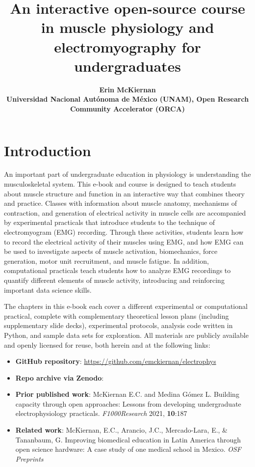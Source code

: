 \documentclass{article}
\title{An interactive open-source course in muscle physiology and electromyography for undergraduates}
\date{\displaydate{articleDate}}
\author{\bfseries Erin McKiernan\mdseries\\Universidad Nacional Autónoma de México (UNAM), Open Research Community Accelerator (ORCA)\\}
\begin{document}
\maketitle
\keywords{}

\section{Introduction}

An important part of undergraduate education in physiology is understanding the musculoskeletal system. This e-book and course is designed to teach students about muscle structure and function in an interactive way that combines theory and practice. Classes with information about muscle anatomy, mechanisms of contraction, and generation of electrical activity in muscle cells are accompanied by experimental practicals that introduce students to the technique of electromyogram (EMG) recording. Through these activities, students learn how to record the electrical activity of their muscles using EMG, and how EMG can be used to investigate aspects of muscle activation, biomechanics, force generation, motor unit recruitment, and muscle fatigue. In addition, computational practicals teach students how to analyze EMG recordings to quantify different elements of muscle activity, introducing and reinforcing important data science skills.

The chapters in this e-book each cover a different experimental or computational practical, complete with complementary theoretical lesson plans (including supplementary slide decks), experimental protocols, analysis code written in Python, and sample data sets for exploration. All materials are publicly available and openly licensed for reuse, both herein and at the following links:

\begin{itemize}
\item \textbf{GitHub repository}: \href{https://github.com/emckiernan/electrophys}{https://github.com/emckiernan/electrophys}
\item \textbf{Repo archive via Zenodo}: \cite{https://doi.org/10.5281/zenodo.4554420}
\item \textbf{Prior published work}: McKiernan E.C. and Medina Gómez L. Building capacity through open approaches: Lessons from developing undergraduate electrophysiology practicals. \textit{F1000Research} 2021, \textbf{10}:187 \cite{McKiernan_2021}
\item \textbf{Related work}: McKiernan, E.C., Arancio, J.C., Mercado-Lara, E., \& Tananbaum, G. Improving biomedical education in Latin America through open science hardware: A case study of one medical school in Mexico. \textit{OSF Preprints} \cite{McKiernan_2025}
\end{itemize}
\end{document}
